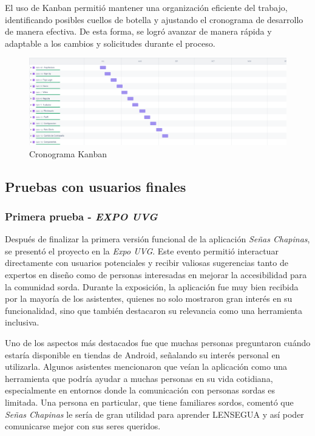 El uso de Kanban permitió mantener una organización eficiente del trabajo, identificando posibles cuellos de botella y ajustando el cronograma de desarrollo de manera efectiva. De esta forma, se logró avanzar de manera rápida y adaptable a los cambios y solicitudes durante el proceso.

\begin{figure} [H]
    \centering
    \includegraphics[width=1\linewidth]{figuras/kanban.png}
    \caption{Cronograma Kanban}
    \label{fig:enter-label}
\end{figure}




\subsection{Pruebas con usuarios finales}


\subsubsection{Primera prueba - \textit{EXPO UVG}}

Después de finalizar la primera versión funcional de la aplicación \textit{Señas Chapinas}, se presentó el proyecto en la \textit{Expo UVG}. Este evento permitió interactuar directamente con usuarios potenciales y recibir valiosas sugerencias tanto de expertos en diseño como de personas interesadas en mejorar la accesibilidad para la comunidad sorda. Durante la exposición, la aplicación fue muy bien recibida por la mayoría de los asistentes, quienes no solo mostraron gran interés en su funcionalidad, sino que también destacaron su relevancia como una herramienta inclusiva.

Uno de los aspectos más destacados fue que muchas personas preguntaron cuándo estaría disponible en tiendas de Android, señalando su interés personal en utilizarla. Algunos asistentes mencionaron que veían la aplicación como una herramienta que podría ayudar a muchas personas en su vida cotidiana, especialmente en entornos donde la comunicación con personas sordas es limitada. Una persona en particular, que tiene familiares sordos, comentó que \textit{Señas Chapinas} le sería de gran utilidad para aprender LENSEGUA y así poder comunicarse mejor con sus seres queridos.

